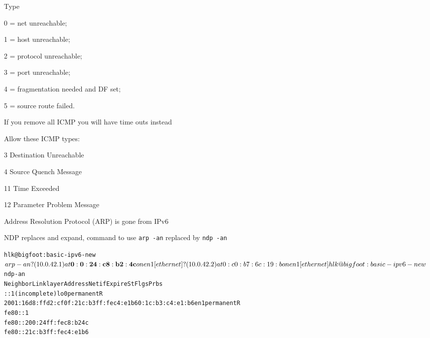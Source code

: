 \documentclass[Screen16to9,17pt]{foils}
\begin{document}
\begin{list1}
\item Type
\begin{list2}
\item 0 = net unreachable;
\item 1 = host unreachable;
\item 2 = protocol unreachable;
\item 3 = port unreachable;
\item 4 = fragmentation needed and DF set;
\item 5 = source route failed.
\end{list2}
\item If you remove all ICMP you will have time outs instead
\item Allow these ICMP types:
\begin{list2}
\item 3 Destination Unreachable
\item 4 Source Quench Message
\item 11 Time Exceeded
\item 12 Parameter Problem Message
\end{list2}
\end{list1}




\begin{list1}
\item Address Resolution Protocol (ARP) is gone from IPv6
\item NDP replaces and expand, command to use \verb+arp -an+ replaced by \verb+ndp -an+
\end{list1}


\begin{alltt}
\small
hlk@bigfoot:basic-ipv6-new$ arp -an
? (10.0.42.1) at{\bf 0:0:24:c8:b2:4c} on en1 [ethernet]
? (10.0.42.2) at 0:c0:b7:6c:19:b on en1 [ethernet]
hlk@bigfoot:basic-ipv6-new$ ndp -an
Neighbor                      Linklayer Address  Netif Expire    St Flgs Prbs
::1                           (incomplete)         lo0 permanent R
2001:16d8:ffd2:cf0f:21c:b3ff:fec4:e1b6 0:1c:b3:c4:e1:b6 en1 permanent R
fe80::1%lo0                   (incomplete)         lo0 permanent R
fe80::200:24ff:fec8:b24c%en1 {\bf 0:0:24:c8:b2:4c}      en1 8h54m51s  S  R
fe80::21c:b3ff:fec4:e1b6%en1  0:1c:b3:c4:e1:b6     en1 permanent R
\end{alltt}
\end{document}
